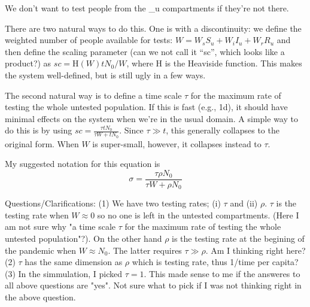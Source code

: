 We don't want to test people from the \_u compartments if they're not there.

There are two natural ways to do this. One is with a discontinuity: we define 
the weighted number of people available for tests: $W = W_s S_u + W_i I_u + W_r R_u$ and then define the scaling parameter (can we not call it ``sc'', which looks like a product?) as $sc = \textrm{H}(W) tN_0/W$, where H is the Heaviside function. This makes the system well-defined, but is still ugly in a few ways.

The second natural way is to define a time scale $\tau$ for the maximum rate of testing the whole untested population. If this is fast (e.g., 1d), it should have minimal effects on the system when we're in the usual domain. A simple way to do this is by using $sc = \frac{\tau tN_0}{\tau W + t N_0}$. Since $\tau \gg t$, this generally collapses to the original form. When $W$ is super-small, however, it collapses instead to $\tau$.

My suggested notation for this equation is $$\sigma = \frac{\tau \rho N_0}{\tau W + \rho N_0}$$

Questions/Clarifications:
(1) We have two testing rates; (i) $\tau$ and (ii) $\rho$.
$\tau$ is the testing rate when $W \approx 0$ so no one is left in the untested compartments. (Here I am not sure why "a time scale $\tau$ for the maximum rate of testing the whole untested population"?).
On the other hand $\rho$ is the testing rate at the begining of the pandemic when $W \approx N_0$. The latter requires $\tau \gg \rho$. Am I thinking right here?  
(2) $\tau$ has the same dimension as $\rho$ which is testing rate, thus 1/time per capita?
(3) In the simmulation, I picked $\tau=1$. This made sense to me if the answeres to all above questions are "yes". Not sure what to pick if I was not thinking right in the above question.

